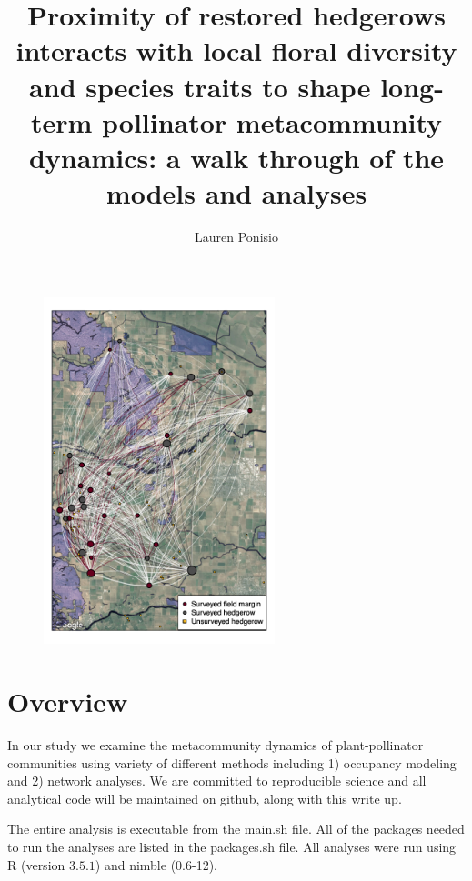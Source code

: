 \documentclass{article}\usepackage[]{graphicx}\usepackage[]{color}
\begin{document}
\title{Proximity of restored hedgerows interacts with local floral diversity and species traits to shape  long-term pollinator metacommunity dynamics: a walk through of the models and analyses}
\author{Lauren Ponisio}


\maketitle

\begin{figure}[h!]
\centering
\includegraphics[width=0.6\textwidth]{figure/degree_spatial.pdf}
\label{fig:network}
\end{figure}
\clearpage

\section{Overview}
In our study we examine the metacommunity dynamics of plant-pollinator
communities using variety of different methods including 1) occupancy
modeling and 2) network analyses.  We are committed to reproducible
science and all analytical code will be maintained on github, along
with this write up.

The entire analysis is executable from the main.sh file. All of the
packages needed to run the analyses are listed in the packages.sh
file. All analyses were run using R (version $3.5.1$)
and nimble (0.6-12).
\end{document}
